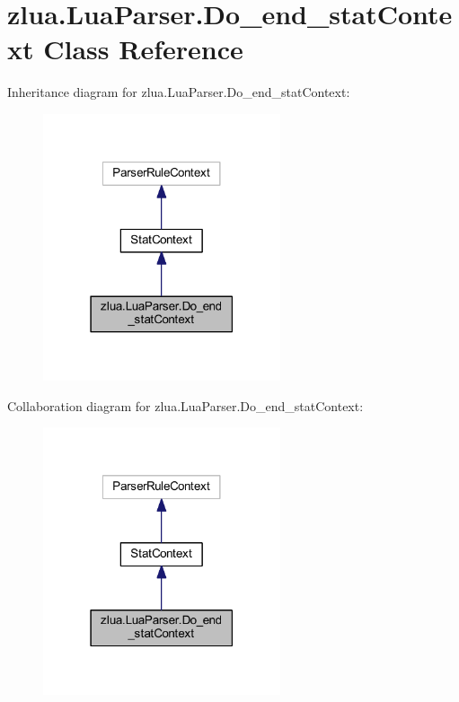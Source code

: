 \hypertarget{classzlua_1_1_lua_parser_1_1_do__end__stat_context}{}\section{zlua.\+Lua\+Parser.\+Do\+\_\+end\+\_\+stat\+Context Class Reference}
\label{classzlua_1_1_lua_parser_1_1_do__end__stat_context}


Inheritance diagram for zlua.\+Lua\+Parser.\+Do\+\_\+end\+\_\+stat\+Context\+:
\nopagebreak
\begin{figure}[H]
\begin{center}
\leavevmode
\includegraphics[width=198pt]{classzlua_1_1_lua_parser_1_1_do__end__stat_context__inherit__graph}
\end{center}
\end{figure}


Collaboration diagram for zlua.\+Lua\+Parser.\+Do\+\_\+end\+\_\+stat\+Context\+:
\nopagebreak
\begin{figure}[H]
\begin{center}
\leavevmode
\includegraphics[width=198pt]{classzlua_1_1_lua_parser_1_1_do__end__stat_context__coll__graph}
\end{center}
\end{figure}
